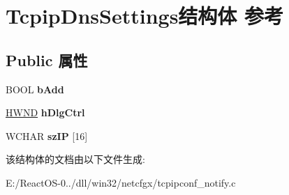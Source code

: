 \hypertarget{struct_tcpip_dns_settings}{}\section{Tcpip\+Dns\+Settings结构体 参考}
\label{struct_tcpip_dns_settings}
\subsection*{Public 属性}
\begin{DoxyCompactItemize}
\item 
\mbox{\label{struct_tcpip_dns_settings_af907d8c6623e9f074d4806af16bba4b3}} 
B\+O\+OL {\bfseries b\+Add}
\item 
\mbox{\label{struct_tcpip_dns_settings_a4d0242e4d52a9d8b2696ccc9f16ad8b7}} 
\hyperlink{interfacevoid}{H\+W\+ND} {\bfseries h\+Dlg\+Ctrl}
\item 
\mbox{\label{struct_tcpip_dns_settings_a041bf05a13b1712a721a4bb7d04c5908}} 
W\+C\+H\+AR {\bfseries sz\+IP} \mbox{[}16\mbox{]}
\end{DoxyCompactItemize}


该结构体的文档由以下文件生成\+:\begin{DoxyCompactItemize}
\item 
E\+:/\+React\+O\+S-\/0../dll/win32/netcfgx/tcpipconf\+\_\+notify.\+c\end{DoxyCompactItemize}
